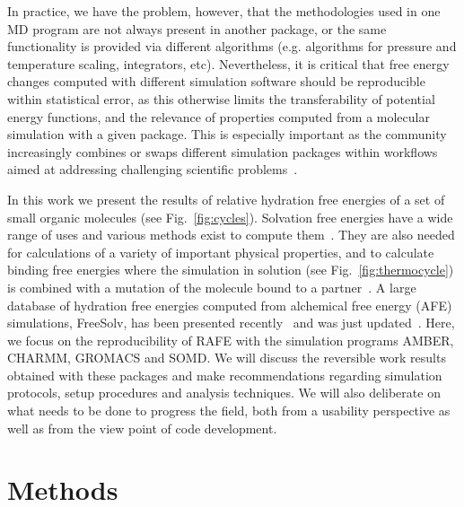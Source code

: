 \documentclass[journal=jctcce,manuscript=article]{achemso}
\begin{document}
In practice, we have the problem, however, that the methodologies
used in one MD program are not always present in another
package, or the same functionality is provided via different algorithms (e.g. algorithms for pressure and temperature 
scaling, integrators, etc).  Nevertheless, it is critical that free energy 
changes computed with different simulation software should be reproducible 
within statistical error, as this otherwise limits the transferability of 
potential energy functions, and the relevance of properties computed from a 
molecular simulation with a given package.  This is especially important as the community  
increasingly combines or swaps different simulation packages within workflows 
aimed at addressing challenging scientific 
problems~\cite{Pronk:2011:CNP:2063384.2063465, doi:10.1021/ci8000937, 
doi:10.1021/jp505332p, loeffler_fesetup:_2015, 
DBLP:journals/corr/Balasubramanian16g}.

In this work we present the results of relative hydration free energies of a 
set of small organic molecules (see Fig.~\ref{fig:cycles}).  Solvation free 
energies have a wide range of uses and various methods exist to compute
them~\cite{Skyner:2015:PCCP}.  They are also needed for calculations of a 
variety of important physical properties, and to calculate binding free 
energies where the simulation in solution (see Fig.~\ref{fig:thermocycle}) is 
combined with a mutation of the molecule bound to a 
partner~\cite{Skyner:2015:PCCP}.  A large database of hydration free energies 
computed from alchemical free energy (AFE) simulations, FreeSolv, has been 
presented recently~\cite{Mobley2014} and was just 
updated~\cite{doi:10.1021/acs.jced.7b00104}. Here, we focus on the 
reproducibility of RAFE with the simulation programs AMBER, CHARMM, GROMACS and 
SOMD.  We will discuss the reversible work results obtained with these packages 
and make recommendations regarding simulation protocols, setup procedures and 
analysis techniques.  We will also deliberate on what needs to be done to 
progress the field, both from a usability perspective as well as from the view 
point of code development.


\section{Methods}
\label{sec:methods}
\end{document}
